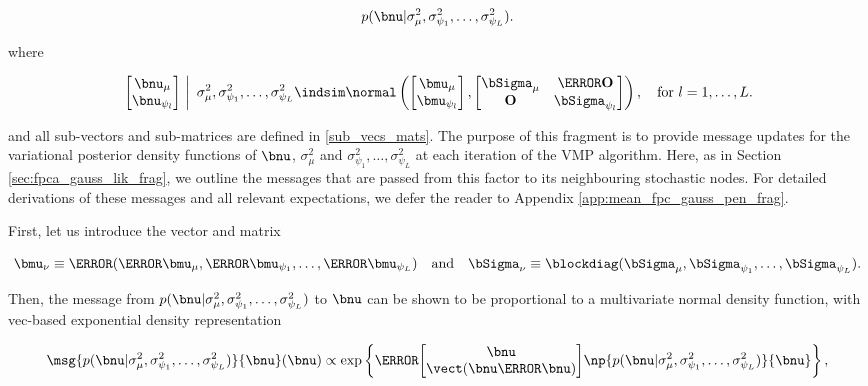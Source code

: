 \documentclass[12pt]{article}
\def\Sigmanu{\bSigma_{\nu}}
\def\munu{\bmu_{\nu}}
\def\sigsqmu{\sigma^2_{\mu}}
\def\mumu{\bmu_\mu}
\def\numu{\bnu_\mu}
\newcommand\nupsi[1]{\bnu_{\psi_{#1}}}
\newcommand\sigsqpsi[1]{\sigma^2_{\psi_{#1}}}
\newcommand\mupsi[1]{\bmu_{\psi_#1}}
\theoremstyle{plain}
\theoremstyle{definition}
\theoremstyle{remark}
\begin{document}
\[
	p (\bnu | \sigsqmu, \sigsqpsi{1}, \dots, \sigsqpsi{L}).
\]

\noindent where

\begin{equation}
	\left.\begin{bmatrix}
		\numu \\
		\nupsi{l}
	\end{bmatrix} \ \right| \ \sigsqmu, \sigsqpsi{1}, \dots, \sigsqpsi{L}
		\indsim
			\normal \left(
				\begin{bmatrix}
					\bmu_\mu \\
					\bmu_{\psi_l} \\
				\end{bmatrix},
				\begin{bmatrix}
					\bSigma_\mu & \T{\textbf{O}} \\
					\textbf{O} & \bSigma_{\psi_l}
				\end{bmatrix}
			\right), \quad \text{for $l = 1, \dots, L$.}
\label{mean_fpc_gauss_pen_factor}
\end{equation}

\noindent and all sub-vectors and sub-matrices are defined in \eqref{sub_vecs_mats}. The purpose of
this fragment is to provide message updates for the variational posterior density functions of $\bnu$, $\sigsqmu$
and $\sigsqpsi{1}, \dots, \sigsqpsi{L}$ at each iteration of the VMP algorithm. Here, as in Section
\ref{sec:fpca_gauss_lik_frag}, we outline the messages that are passed from this factor to its neighbouring
stochastic nodes. For detailed derivations of these messages and all relevant expectations, we defer the
reader to Appendix \ref{app:mean_fpc_gauss_pen_frag}.

First, let us introduce the vector and matrix

\begin{equation}
	\munu \equiv \T{(\T{\mumu}, \T{\mupsi{1}}, \dots, \T{\mupsi{L}})} \quad
	\text{and} \quad
	\Sigmanu \equiv \blockdiag (\bSigma_\mu, \bSigma_{\psi_1}, \dots, \bSigma_{\psi_L}).
\label{munu_Sigmanu}
\end{equation}

\noindent Then, the message from $p (\bnu | \sigsqmu, \sigsqpsi{1}, \dots, \sigsqpsi{L})$ to $\bnu$
can be shown to be proportional to a multivariate normal density function, with vec-based exponential density
representation

\begin{equation}
	\msg{p (\bnu | \sigsqmu, \sigsqpsi{1}, \dots, \sigsqpsi{L})}{\bnu} (\bnu)
		\propto
			\exp \left\{
				\T{\begin{bmatrix}
					\bnu \\
					\vect (\bnu \T{\bnu})
				\end{bmatrix}}
				\np{p (\bnu | \sigsqmu, \sigsqpsi{1}, \dots, \sigsqpsi{L})}{\bnu}
			\right\},
\label{msg_pen_nu}
\end{equation}
\end{document}
